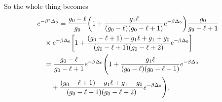 So the whole thing becomes 
\begin{align}
    &e^{-\beta^*\Delta_0}=\frac{g_0-\ell}{g_0}\qty(1+\frac{g_1\ell}{(g_0-\ell)(g_0-\ell+1)}e^{-\beta\Delta_0})\frac{g_0}{g_0-\ell+1}\nonumber\\
    &\quad\times e^{-\beta\Delta_0}\qty[1+\frac{(g_0-\ell+1)-g_1\ell+g_1+g_0}{(g_0-\ell+1)(g_0-\ell+2)}e^{-\beta\Delta_0}]\nonumber\\
    &\quad=\frac{g_0-\ell}{g_0-\ell+1}e^{-\beta\Delta_0}\Biggr(1+\frac{g_1\ell}{(g_0-\ell)(g_0-\ell+1)}e^{-\beta\Delta_0}\nonumber\\
    &\quad\quad +\frac{(g_0-\ell+1)-g_1\ell+g_1+g_0}{(g_0-\ell+1)(g_0-\ell+2)}e^{-\beta\Delta_0}\Biggr).
\end{align}